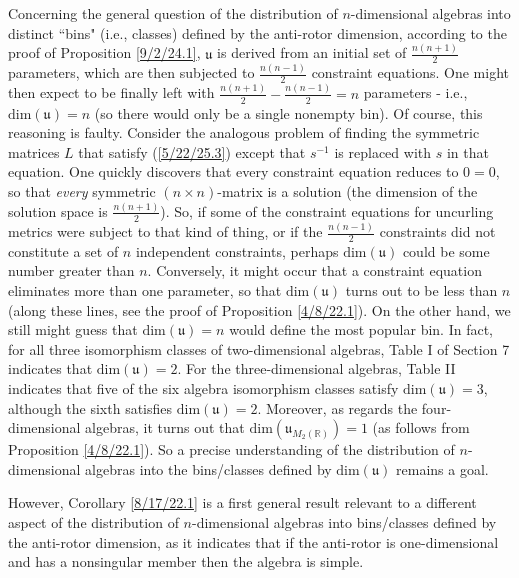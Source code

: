 \documentclass{amsart}
\theoremstyle{definition}
\numberwithin{theorem}{section}
\numberwithin{equation}{section}
\begin{document}
Concerning the general question of the distribution of $n$-dimensional algebras into distinct ``bins" (i.e., classes) defined by the anti-rotor dimension, according to the proof of Proposition \ref{9/2/24.1}, $\mathfrak{u}$ is derived from an initial set of $\frac{n(n+1)}{2}$ parameters, which are then subjected to  $\frac{n(n-1)}{2}$ constraint equations.  One might then expect to be finally left with $\frac{n(n+1)}{2} - \frac{n(n-1)}{2} = n$ parameters - i.e., $\text{dim}(\mathfrak{u}) = n$ (so there would only be a single nonempty bin).  Of course, this reasoning is faulty.  Consider the analogous problem of finding the symmetric matrices $L$ that satisfy (\ref{5/22/25.3}) except that $s^{-1}$ is replaced with $s$ in that equation.  One quickly discovers that every constraint equation reduces to $0=0$, so that {\it every} symmetric $(n\times n)$-matrix is a solution (the dimension of the solution space is $\frac{n(n+1)}{2}$).  So, if some of the constraint equations for uncurling metrics were subject to  that kind of thing, or if the $\frac{n(n-1)}{2}$ constraints did not constitute a set of $n$ independent constraints, perhaps $\text{dim}(\mathfrak{u})$ could be some number greater than $n$.  Conversely, it might occur that a constraint equation eliminates more than one parameter, so that $\text{dim}(\mathfrak{u})$ turns out to be less than $n$ (along these lines, see the proof of Proposition \ref{4/8/22.1}).  On the other hand, we still might guess that $\text{dim}(\mathfrak{u}) = n$ would define the most popular bin.  In fact, for all three isomorphism classes of two-dimensional algebras, Table I of Section 7 indicates that \mbox{$\text{dim}(\mathfrak{u}) = 2$}.  For the three-dimensional algebras, Table II indicates that five of the six algebra isomorphism classes satisfy $\text{dim}(\mathfrak{u}) = 3$, although the sixth satisfies $\text{dim}(\mathfrak{u}) = 2$.  Moreover, as regards the four-dimensional algebras, it turns out that $\text{dim}(\mathfrak{u}_{M_2(\mathbb{R})}) = 1$ (as follows from Proposition \ref{4/8/22.1}). So a precise understanding of the distribution of $n$-dimensional algebras into the bins/classes defined by $\text{dim}(\mathfrak{u})$ remains a goal.  

However, Corollary \ref{8/17/22.1} is a first general result relevant to a different aspect of the distribution of $n$-dimensional algebras into bins/classes defined by the anti-rotor dimension, as it indicates that if the anti-rotor is one-dimensional and has a nonsingular member then the algebra is simple.  
\end{document}

